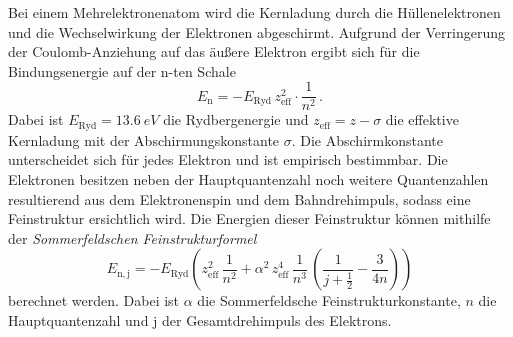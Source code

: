 Bei einem Mehrelektronenatom wird die Kernladung durch die Hüllenelektronen und die Wechselwirkung der Elektronen abgeschirmt. 
Aufgrund der Verringerung der Coulomb-Anziehung auf das äußere Elektron ergibt sich für die Bindungsenergie auf der n-ten Schale
\begin{equation}
    E_\text{n} = - E_\text{Ryd} \, z_{\text{eff}}^2 \cdot \frac{1}{n^2} \, .
\end{equation}
Dabei ist $E_\text{Ryd} = \qty{13.6}{eV}$ die Rydbergenergie und $z_\text{eff} = z - \sigma$ die effektive Kernladung mit der Abschirmungskonstante $\sigma$.
Die Abschirmkonstante unterscheidet sich für jedes Elektron und ist empirisch bestimmbar. 
Die Elektronen besitzen neben der Hauptquantenzahl noch weitere Quantenzahlen resultierend aus dem Elektronenspin und dem Bahndrehimpuls, 
sodass eine Feinstruktur ersichtlich wird.
Die Energien dieser Feinstruktur können mithilfe der \textit{Sommerfeldschen Feinstrukturformel}
\begin{equation} \label{eq:feinstruktur}
    E_{\mathrm{n}, \mathrm{j}}= - E_\text{Ryd}\left(z_{\mathrm{eff}}^{2} \, \frac{1}{n^{2}}+\alpha^{2} \, z_{\mathrm{eff}}^{4} \, \frac{1}{n^{3}} \, \left(\frac{1}{j+\frac{1}{2}}-\frac{3}{4 n}\right)\right)
\end{equation}
berechnet werden.
Dabei ist $\alpha$ die Sommerfeldsche Feinstrukturkonstante, $n$ die Hauptquantenzahl und j der Gesamtdrehimpuls des Elektrons.

